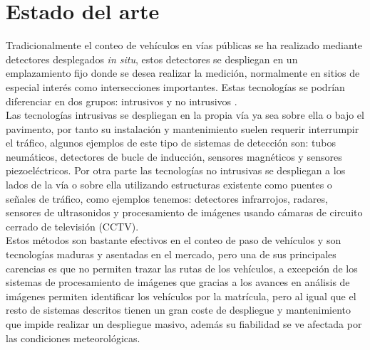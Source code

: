 \documentclass[../proyecto.tex]{subfiles}
\begin{document}
\chapter{Estado del arte}\label{chap:estado_arte}

Tradicionalmente el conteo de vehículos en vías públicas se ha realizado mediante detectores desplegados \textit{in situ}, estos detectores se despliegan en un emplazamiento fijo donde se desea realizar la medición, normalmente en sitios de especial interés como intersecciones importantes. Estas tecnologías se podrían diferenciar en dos grupos: intrusivos y no intrusivos \cite{MIMBELA20078}.\\

Las tecnologías intrusivas se despliegan en la propia vía ya sea sobre ella o bajo el pavimento, por tanto su instalación y mantenimiento suelen requerir interrumpir el tráfico, algunos ejemplos de este tipo de sistemas de detección son: tubos neumáticos, detectores de bucle de inducción, sensores magnéticos y sensores piezoeléctricos. Por otra parte las tecnologías no intrusivas se despliegan a los lados de la vía o sobre ella utilizando estructuras existente como puentes o señales de tráfico, como ejemplos tenemos: detectores infrarrojos, radares, sensores de ultrasonidos y  procesamiento de imágenes usando cámaras de circuito cerrado de televisión (CCTV).\\

 Estos métodos son bastante efectivos en el conteo de paso de vehículos \cite{CZYZEWSKI20196} y son tecnologías maduras y asentadas en el mercado, pero una de sus principales carencias es que no permiten trazar las rutas de los vehículos, a excepción de los sistemas de procesamiento de imágenes que gracias a los avances en análisis de imágenes permiten identificar los vehículos por la matrícula, pero al igual que el resto de sistemas descritos tienen un gran coste de despliegue y mantenimiento que impide realizar un despliegue masivo, además su fiabilidad se ve afectada por las condiciones meteorológicas.\\
\end{document}
